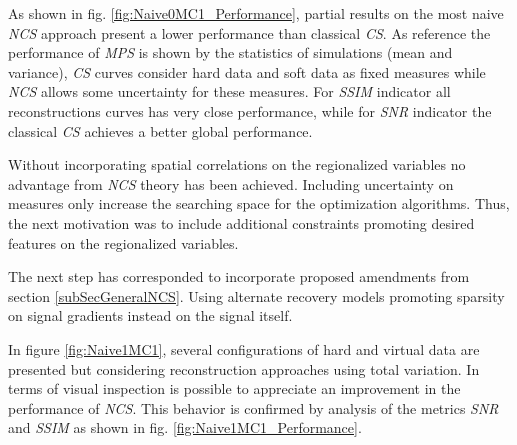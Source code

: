 As shown in fig. \ref{fig:Naive0MC1_Performance}, partial results on the most naive \emph{NCS} approach present a lower performance than classical \emph{CS}. As reference the performance of \emph{MPS} is shown by the statistics of simulations (mean and variance), \emph{CS} curves consider hard data and soft data as fixed measures while \emph{NCS} allows some uncertainty for these measures. For \emph{SSIM} indicator all reconstructions curves has very close performance, while for \emph{SNR} indicator the classical \emph{CS} achieves a better global performance.  

Without incorporating  spatial correlations on the regionalized variables no advantage from \emph{NCS} theory has been achieved. Including uncertainty on measures only increase the searching space for the optimization algorithms. Thus, the next motivation was to include additional constraints promoting desired features on the regionalized variables. 

The next step has corresponded to incorporate proposed amendments from section \ref{subSecGeneralNCS}. Using alternate recovery models promoting sparsity on signal gradients instead on the signal itself. 

In figure \ref{fig:Naive1MC1}, several configurations of hard and virtual data are presented but considering reconstruction approaches using total variation. In terms of visual inspection is possible to appreciate an improvement in the performance of \emph{NCS}. This behavior is confirmed by analysis of the metrics \emph{SNR} and \emph{SSIM} as shown in fig. \ref{fig:Naive1MC1_Performance}. 


